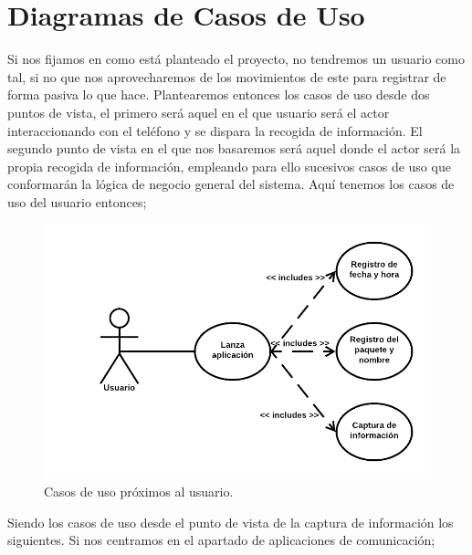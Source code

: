 \documentclass[12pt,a4paper,oneside]{book} %
\begin{document}
\section{Diagramas de Casos de Uso}
Si nos fijamos en como está planteado el proyecto, no tendremos un usuario como tal, si no que nos aprovecharemos de los movimientos de este para registrar de forma pasiva lo que hace. 
\newline
\newline
Plantearemos entonces los casos de uso desde dos puntos de vista, el primero será aquel en el que usuario será el actor interaccionando con el teléfono y se dispara la recogida de información. 
\newline 
\newline
El segundo punto de vista en el que nos basaremos será aquel donde el actor será la propia recogida de información, empleando para ello sucesivos casos de uso que conformarán la lógica de negocio general del sistema. 
\newline 
\newline 
Aquí tenemos los casos de uso del usuario entonces; 
\begin{figure}[H]
	\begin{center}
		\includegraphics[scale=0.30]{pictures/usecases/usecases01.png} %
	\end{center}
	\caption[Casos de uso 01]{Casos de uso próximos al usuario.}
\end{figure}
\pagebreak
Siendo los casos de uso desde el punto de vista de la captura de información los siguientes. Si nos centramos en el apartado de aplicaciones de comunicación; 
\end{document}
